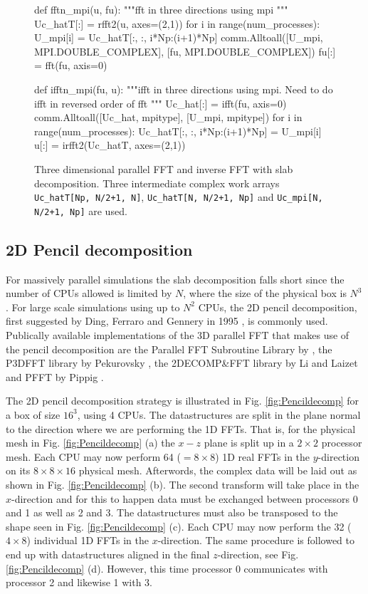 \documentclass[11pt, oneside]{article}
\newcommand{\inpyth}{\lstinline[style=pythonstyle, basicstyle=\ttfamily]} %[]%
\begin{document}
\begin{figure}
\begin{python}
def fftn_mpi(u, fu):
    """fft in three directions using mpi
    """
    Uc_hatT[:] = rfft2(u, axes=(2,1))
    for i in range(num_processes):
        U_mpi[i] = Uc_hatT[:, :, i*Np:(i+1)*Np]
    comm.Alltoall([U_mpi, MPI.DOUBLE_COMPLEX], [fu, MPI.DOUBLE_COMPLEX])
    fu[:] = fft(fu, axis=0)

def ifftn_mpi(fu, u):
    """ifft in three directions using mpi.
    Need to do ifft in reversed order of fft
    """
    Uc_hat[:] = ifft(fu, axis=0)
    comm.Alltoall([Uc_hat, mpitype], [U_mpi, mpitype])
    for i in range(num_processes):
        Uc_hatT[:, :, i*Np:(i+1)*Np] = U_mpi[i]
    u[:] = irfft2(Uc_hatT, axes=(2,1))

\end{python}
\caption{Three dimensional parallel FFT and inverse FFT with slab decomposition. Three intermediate complex work arrays \inpyth{Uc_hatT[Np, N/2+1, N]}, \inpyth{Uc_hatT[N, N/2+1, Np]} and \inpyth{Uc_mpi[N, N/2+1, Np]} are used.}
\label{fig:slabfft}
\end{figure}

\subsection{2D Pencil decomposition}
For massively parallel simulations the slab decomposition falls short since the number of CPUs allowed is limited by $N$, where the size of the physical box is $N^3$. For large scale simulations using up to $N^2$ CPUs, the 2D pencil decomposition, first suggested by Ding, Ferraro and Gennery in 1995 \cite{Ding95}, is commonly used. Publically available implementations of the 3D parallel FFT that makes use of the pencil decomposition are the Parallel FFT Subroutine Library by \cite{PlimptonFFT}, the P3DFFT library by Pekurovsky \cite{p3dfft, Pekurovsky2012}, the 2DECOMP\&FFT library by Li and Laizet \cite{Li2010} and PFFT by Pippig \cite{Pi13}.

The 2D pencil decomposition strategy is illustrated in Fig. \ref{fig:Pencildecomp} for a box of size $16^3$, using 4 CPUs. The datastructures are split in the plane normal to the direction where we are performing the 1D FFTs. That is, for the physical mesh in Fig. \ref{fig:Pencildecomp} (a) the $x-z$ plane is split up in a $2\times2$ processor mesh. Each CPU may now perform 64 ($= 8 \times 8$) 1D real FFTs in the $y$-direction on its $8 \times 8 \times 16$ physical mesh. Afterwords, the complex data will be laid out as shown in Fig. \ref{fig:Pencildecomp} (b). The second transform will take place in the $x$-direction and for this to happen data must be exchanged between processors 0 and 1 as well as 2 and 3. The datastructures must also be transposed to the shape seen in Fig. \ref{fig:Pencildecomp} (c). Each CPU may now perform the 32 ($4 \times 8$) individual 1D FFTs in the $x$-direction. The same procedure is followed to end up with datastructures aligned in the final $z$-direction, see Fig. \ref{fig:Pencildecomp} (d). However, this time processor 0 communicates with processor 2 and likewise 1 with 3.
\end{document}
